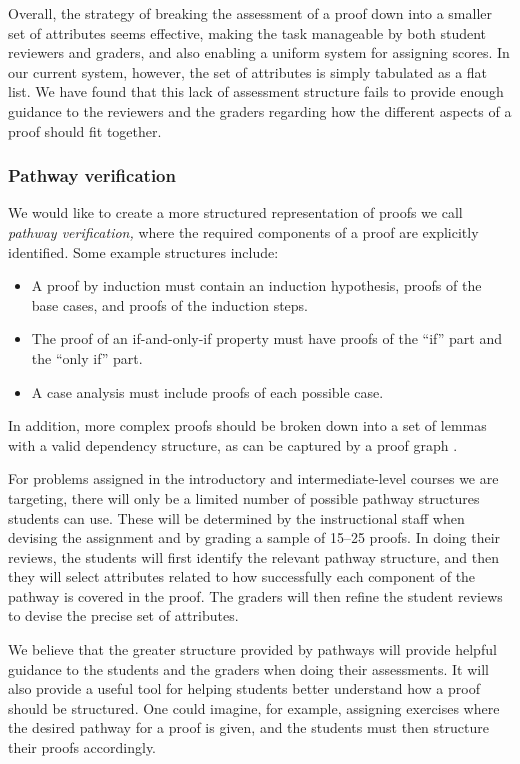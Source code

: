 \documentclass[12pt]{article}
\begin{document}
Overall, the strategy of breaking the assessment of a proof down into a smaller
set of attributes seems effective, making the task manageable by
both student reviewers and graders, and also enabling a uniform
system for assigning scores.  In our current system, however, the set
of attributes is simply tabulated as a flat list.  We have found that
this lack of assessment structure fails to provide enough guidance to the
reviewers and the graders regarding how the different aspects of a
proof should fit together.

\subsubsection{Pathway verification}

We would like to
create a more structured representation of proofs we call {\em pathway
  verification,}  where the required components of a proof are
explicitly identified.  Some example structures include:
\begin{itemize}
\item A proof by induction must contain an induction hypothesis,
  proofs of the base cases, and proofs of the induction steps.
\item The proof of an if-and-only-if property must have proofs of the
  ``if'' part and the ``only if'' part.
\item A case analysis must include proofs of each possible case.
\end{itemize}
In addition, more complex proofs should be broken down into a set of
lemmas with a valid dependency structure,
as can be captured by a proof graph \cite{anderson-science85}.

For problems assigned in the introductory and intermediate-level
courses we are targeting, there will only be a limited number of
possible pathway structures students can use.  These will be
determined by the instructional staff when devising the assignment and
by grading a sample of 15--25 proofs.  In doing their reviews, the
students will first identify the relevant pathway structure, and then
they will select attributes related to how successfully each component
of the pathway is covered in the proof.  The graders will then refine
the student reviews to devise the precise set of attributes.

We believe that the greater structure provided by pathways will
provide helpful guidance to the students and the graders when doing
their assessments.  It will also provide a useful tool for helping
students better understand how a proof should be structured.  One
could imagine, for example, assigning exercises where the
desired pathway for a proof is given, and the students must
then structure their proofs accordingly.
\end{document}
